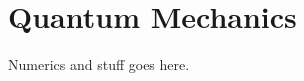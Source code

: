 \documentclass[12pt,twoside]{reedthesis}
\begin{document}
\section{Quantum Mechanics}
Numerics and stuff goes here.
%
%
%	
%
%
%
%
\backmatter %
%

 
  
%
   \nocite{*}
   

\end{document}
